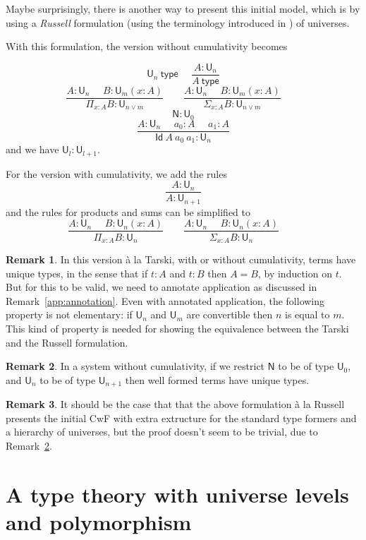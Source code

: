 \documentclass[11pt,a4paper]{article}
\theoremstyle{definition}
\newtheorem{remark}{Remark}[theorem]
\newcommand{\Id}{\mathsf{Id}}
\def\NN{\mathsf{N}}
\def\UU{\mathsf{U}}
\newcommand{\type}{\mathsf{type}}
\newcommand{\mypi}[3]{\Pi_{#1:#2}#3}
\newcommand{\mysig}[3]{\Sigma_{#1:#2}#3}
\begin{document}
\medskip

Maybe surprisingly, there is another way to present this initial model, which is by using
a {\em Russell} formulation (using the terminology introduced in \cite{martinlof:padova}) of
universes.

With this formulation, the version without cumulativity becomes

$$
\UU_n~\type~~~~~~
\frac{A:\UU_{n}}{A~\type}
$$
$$
\frac{A:\UU_{n}~~~~~~B:\UU_m(x:A)}
     {\mypi{x}{A}{B}:\UU_{n\vee m}}~~~~~~~~~
\frac{A:\UU_{n}~~~~~~B:\UU_m(x:A)}
     {\mysig{x}{A}{B}:\UU_{n\vee m}}~~~~~~~~~
$$
$$\NN:\UU_{0}$$
$$
\frac{A:\UU_n~~~~~~a_0:A~~~~~~a_1:A}
{\Id~A~a_0~a_1:\UU_n}
$$
and we have ${\UU_l}:\UU_{l+1}$.

\medskip

For the version with cumulativity, we add the rules
$$
\frac{A:\UU_{n}}{A:\UU_{n+1}}
$$
and the rules for products and sums can be simplified to
$$
\frac{A:\UU_{n}~~~~~~B:\UU_n(x:A)}
     {\mypi{x}{A}{B}:\UU_{n}}~~~~~~~~~
\frac{A:\UU_{n}~~~~~~B:\UU_n(x:A)}
     {\mysig{x}{A}{B}:\UU_{n}}~~~~~~~~~
$$

\begin{remark}
  In this version \`a la Tarski, with or without cumulativity, terms have unique types, in the sense that if $t : A$ and $t : B$ then $A = B$, by induction on $t$. But for this to be valid, we need to annotate application as discussed in Remark~\ref{app:annotation}.
  Even with annotated application, the following property is not elementary: if $\UU_n$ and $\UU_m$ are convertible then $n$ is equal to $m$. This kind of property is needed for showing the equivalence between the Tarski and the Russell formulation.
\end{remark}

\begin{remark} \label{uniqueness:without:cumulativity}
  In a system without cumulativity, if we restrict $\NN$ to be of type $\UU_0$, and $\UU_n$ to be of type $\UU_{n+1}$ then well formed terms have unique types.
\end{remark}

\begin{remark}
  It should be the case that that the above formulation \`a la Russell presents the initial CwF with extra extructure for the standard type formers and a hierarchy of universes, but the proof doesn't seem to be trivial, due to Remark~\ref{uniqueness:without:cumulativity}.
\end{remark}

 \section{A type theory with universe levels and polymorphism }\label{sec:internal}
\end{document}
